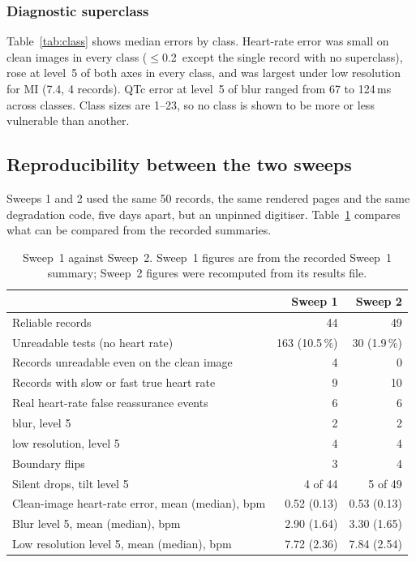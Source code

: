 \subsubsection{Diagnostic superclass}
Table~\ref{tab:class} shows median errors by class. Heart-rate error was small on clean images in every class ($\le$0.2\bpm\ except the single record with no superclass), rose at level~5 of both axes in every class, and was largest under low resolution for MI (7.4\bpm, 4 records). QTc error at level~5 of blur ranged from 67 to 124\,ms across classes. Class sizes are 1--23, so no class is shown to be more or less vulnerable than another.



\subsection{Reproducibility between the two sweeps}\label{sec:drift}
Sweeps 1 and 2 used the same 50 records, the same rendered pages and the same degradation code, five days apart, but an unpinned digitiser. Table~\ref{tab:repro} compares what can be compared from the recorded summaries.

\begin{table}[ht]
\centering\small
\caption{Sweep~1 against Sweep~2. Sweep~1 figures are from the recorded Sweep~1 summary; Sweep~2 figures were recomputed from its results file.}\label{tab:repro}
\begin{tabular}{@{}lrr@{}}
\toprule
 & Sweep 1 & Sweep 2 \\
\midrule
Reliable records & 44 & 49 \\
Unreadable tests (no heart rate) & 163 (10.5\,\%) & 30 (1.9\,\%) \\
Records unreadable even on the clean image & 4 & 0 \\
Records with slow or fast true heart rate & 9 & 10 \\
Real heart-rate false reassurance events & 6 & 6 \\
\quad blur, level 5 & 2 & 2 \\
\quad low resolution, level 5 & 4 & 4 \\
Boundary flips & 3 & 4 \\
Silent drops, tilt level 5 & 4 of 44 & 5 of 49 \\
Clean-image heart-rate error, mean (median), bpm & 0.52 (0.13) & 0.53 (0.13) \\
Blur level 5, mean (median), bpm & 2.90 (1.64) & 3.30 (1.65) \\
Low resolution level 5, mean (median), bpm & 7.72 (2.36) & 7.84 (2.54) \\
\bottomrule
\end{tabular}
\end{table}

